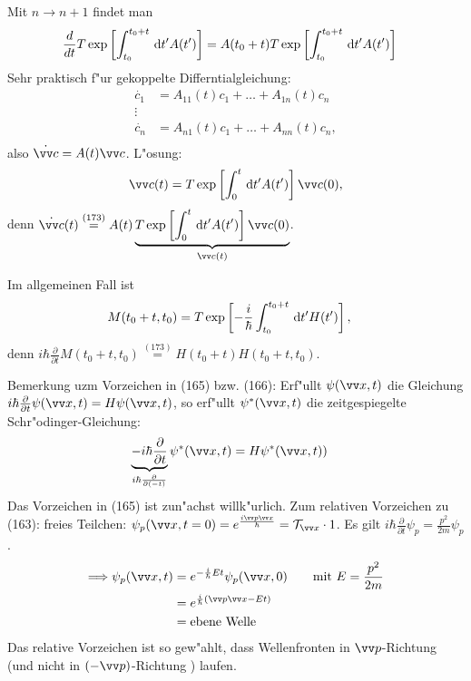 \documentclass[a4paper]{scrartcl}
\newcommand{\dd}{\ensuremath \, \mathrm{d}}
\begin{document}
{Mit $n \rightarrow n +1$ findet man
\begin{align}
\frac d {dt} T \exp \left[ \int_{t_0}^{t_0+t} \dd t' A(t') \right] & = A(t_0 + t) T \exp \left[ \int_{t_0}^{t_0+t} \dd t' A(t') \right]
\end{align}
Sehr praktisch f"ur gekoppelte Differntialgleichung:
\begin{align*}
\dot {c_1} & = A_{11}(t) c_1 + \ldots + A_{1n}(t) c_n \\
\vdots \\
\dot {c_n} & = A_{n1}(t) c_1 + \ldots + A_{nn}(t) c_n, \\
\end{align*}
also $\dot{ \vv c} = A(t) \vv c$. L"osung:
\begin{align}
\vv c(t) = T \exp \left[ \int_{0}^t \dd t' A(t') \right] \vv c(0),
\end{align}
denn $\dot{ \vv c}(t) \stackrel{(173)}= A(t) \underbrace{ T \exp \left[ \int_0^t \dd t' A(t') \right] \vv c(0) }_{\vv c(t)}$.

Im allgemeinen Fall ist
\begin{align}
M(t_0 + t, t_0) &= T \exp \left[ - \frac i \hbar \int_{t_0}^{t_0+t} \dd t' H(t') \right],
\end{align}
denn $i \hbar \frac \partial {\partial t} M(t_0+ t, t_0) \stackrel{(173)}=  H(t_0+t) H(t_0+t, t_0)$. 

Bemerkung uzm Vorzeichen in (165) bzw. (166): Erf"ullt $\psi(\vv x, t)$ die Gleichung $i \hbar \frac \partial {\partial t} \psi( \vv x, t) = H \psi (\vv x, t)$, so erf"ullt $\psi^*(\vv x, t)$ die zeitgespiegelte Schr"odinger-Gleichung:
\begin{align}
\underbrace{ - i \hbar \frac \partial {\partial t}}_{i \hbar \frac \partial {\partial (-t)}} \psi^*(\vv x, t) & = H \psi^*(\vv x, t))
\end{align}
Das Vorzeichen in (165) ist zun"achst willk"urlich. Zum relativen Vorzeichen zu (163): freies Teilchen: $\psi_p(\vv x, t=0) = e^{\frac{i \vv p \vv x}{\hbar}} = \mathcal T_{\vv x} \cdot 1$. Es gilt $i \hbar \frac \partial {\partial t} \psi_p = \frac{p^2}{2m} \psi_p$.
\begin{align}
\begin{split}
\Longrightarrow \psi_p(\vv x, t) & = e^{-\frac i \hbar E t } \psi_p(\vv x, 0) \quad \quad \mathrm{mit \ }E = \frac{p^2}{2m}\\
& = e^{\frac i \hbar ( \vv p \vv x - Et)} \\
& = \mathrm{ebene \ Welle}
\end{split}
\end{align}
Das relative Vorzeichen ist so gew"ahlt, dass Wellenfronten in $\vv p$-Richtung (und nicht in $(-\vv p)$-Richtung ) laufen.
}
\end{document}

